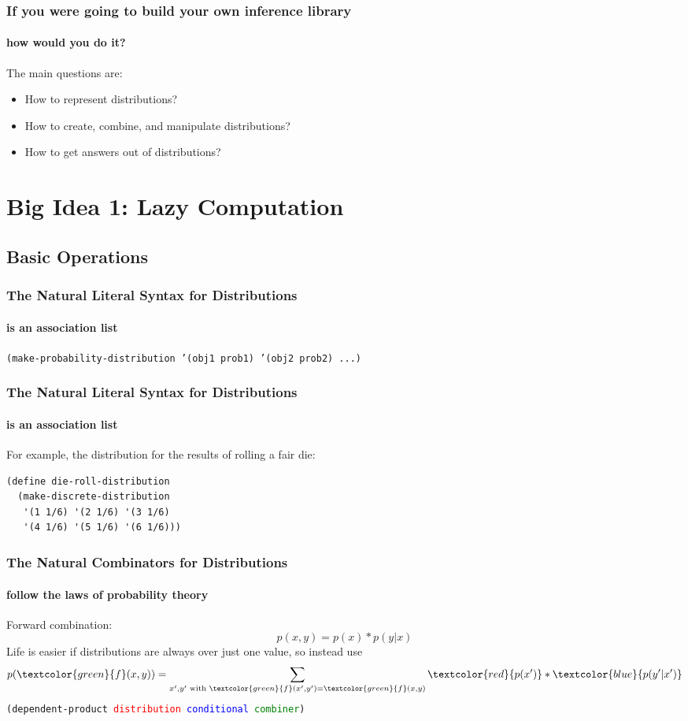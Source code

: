 \documentclass{beamer}
\newcommand{\code}[1]{\texttt{#1}}
\newcommand{\green}[1]{\textcolor{green}{#1}}
\newcommand{\red}[1]{\textcolor{red}{#1}}
\newcommand{\blue}[1]{\textcolor{blue}{#1}}
\begin{document}
\begin{frame}
  \frametitle{If you were going to build your own inference library}
  \framesubtitle{how would you do it?}

  The main questions are:
  \begin{itemize}
  \item How to represent distributions?
  \item How to create, combine, and manipulate distributions?
  \item How to get answers out of distributions?
  \end{itemize}
\end{frame}

\section{Big Idea 1: Lazy Computation}
\subsection{Basic Operations}

\begin{frame}
  \frametitle{The Natural Literal Syntax for Distributions}
  \framesubtitle{is an association list}

  \code{(make-probability-distribution '(obj1 prob1) '(obj2 prob2) ...)}

\end{frame}

\begin{frame}[fragile=singleslide]
  \frametitle{The Natural Literal Syntax for Distributions}
  \framesubtitle{is an association list}
  For example, the distribution for the results of rolling a fair die:
\begin{verbatim}
(define die-roll-distribution
  (make-discrete-distribution
   '(1 1/6) '(2 1/6) '(3 1/6)
   '(4 1/6) '(5 1/6) '(6 1/6)))
\end{verbatim}
\end{frame}

\begin{frame}
  \frametitle{The Natural Combinators for Distributions}
  \framesubtitle{follow the laws of probability theory}
  Forward combination:
  \[ p(x, y) = p(x) * p(y|x) \]
  \pause
  Life is easier if distributions are always over just one value,
  so instead use
  \[ p(\green{f}(x, y)) = \sum_{x', y' \textrm{ with } \green{f}(x', y') = \green{f}(x, y)} \red{p(x')} * \blue{p(y'|x')} \]
  \pause
  \code{(dependent-product \red{distribution} \blue{conditional} \green{combiner})}
\end{frame}
\end{document}

